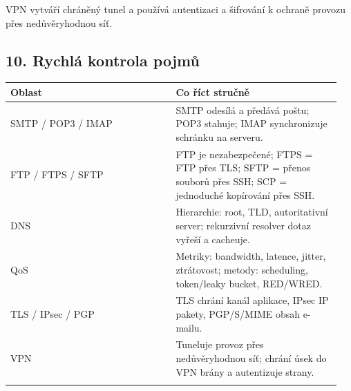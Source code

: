 VPN vytváří chráněný tunel a používá autentizaci a šifrování k ochraně provozu přes nedůvěryhodnou síť.

\subsection*{10. Rychlá kontrola pojmů}

\begin{longtable}{p{0.475\linewidth}p{0.475\linewidth}}
\toprule
\textbf{Oblast} & \textbf{Co říct stručně} \\
\midrule\endhead
SMTP / POP3 / IMAP & SMTP odesílá a předává poštu; POP3 stahuje; IMAP synchronizuje schránku na serveru. \\
\addlinespace
FTP / FTPS / SFTP & FTP je nezabezpečené; FTPS = FTP přes TLS; SFTP = přenos souborů přes SSH; SCP = jednoduché kopírování přes SSH. \\
\addlinespace
DNS & Hierarchie: root, TLD, autoritativní server; rekurzivní resolver dotaz vyřeší a cacheuje. \\
\addlinespace
QoS & Metriky: bandwidth, latence, jitter, ztrátovost; metody: scheduling, token/leaky bucket, RED/WRED. \\
\addlinespace
TLS / IPsec / PGP & TLS chrání kanál aplikace, IPsec IP pakety, PGP/S/MIME obsah e-mailu. \\
\addlinespace
VPN & Tuneluje provoz přes nedůvěryhodnou síť; chrání úsek do VPN brány a autentizuje strany. \\
\addlinespace
\bottomrule
\end{longtable}

\newpage

